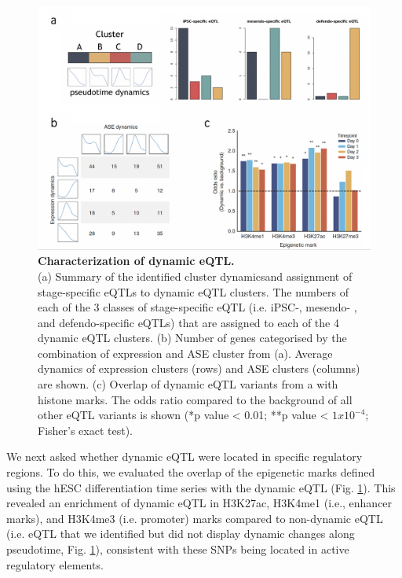\begin{figure}[htbp]
\centering
\includegraphics[width=15cm]{Chapter4/Fig/endodiff_dynamic_enrich.png}
\caption[Characterization of dynamic eQTL]{\textbf{Characterization of dynamic eQTL.}\\
(a) Summary of the identified cluster dynamics\footnotemark and assignment of stage-specific eQTLs to dynamic eQTL clusters. 
The numbers of each of the 3 classes of stage-specific eQTL (i.e. iPSC-, mesendo- , and defendo-specific eQTLs) that are assigned to each of the 4 dynamic eQTL clusters.
(b) Number of genes categorised by the combination of expression and ASE cluster from (a). 
Average dynamics of expression clusters (rows) and ASE clusters (columns) are shown.
(c) Overlap of dynamic eQTL variants from a with histone marks. The odds ratio compared to the background of all other eQTL variants is shown (*p value < 0.01; **p value < $1x10^{-4}$; Fisher’s exact test).}
\label{fig:endodiff_dynamic_eqtl_enrichment}
\end{figure}



We next asked whether dynamic eQTL were located in specific regulatory regions. 
To do this, we evaluated the overlap of the epigenetic marks defined using the hESC differentiation time series with the dynamic eQTL (Fig. \ref{fig:endodiff_dynamic_eqtl_enrichment}). 
This revealed an enrichment of dynamic eQTL in H3K27ac, H3K4me1 (i.e., enhancer marks), and H3K4me3 (i.e. promoter) marks compared to non-dynamic eQTL (i.e. eQTL that we identified but did not display dynamic changes along pseudotime, Fig. \ref{fig:endodiff_dynamic_eqtl_enrichment}), consistent with these SNPs being located in active regulatory elements.


